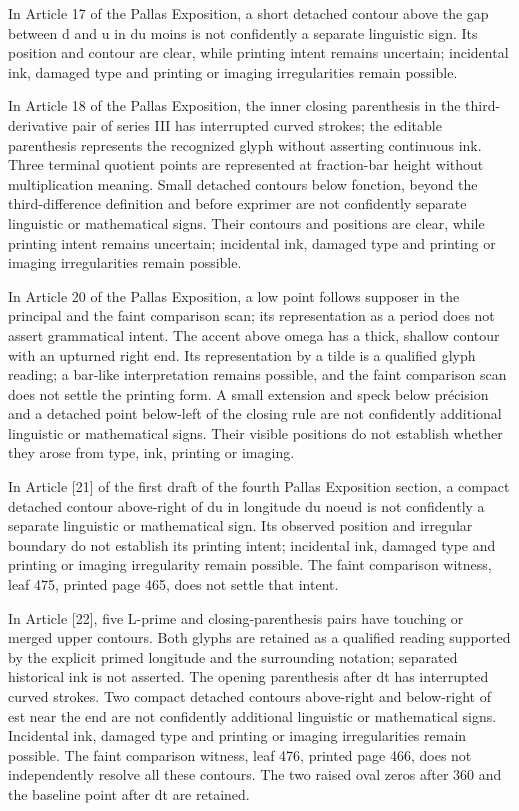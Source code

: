 In Article 17 of the Pallas Exposition, a short detached contour above the gap between d and u in du moins is not confidently a separate linguistic sign. Its position and contour are clear, while printing intent remains uncertain; incidental ink, damaged type and printing or imaging irregularities remain possible.

In Article 18 of the Pallas Exposition, the inner closing parenthesis in the third-derivative pair of series III has interrupted curved strokes; the editable parenthesis represents the recognized glyph without asserting continuous ink. Three terminal quotient points are represented at fraction-bar height without multiplication meaning. Small detached contours below fonction, beyond the third-difference definition and before exprimer are not confidently separate linguistic or mathematical signs. Their contours and positions are clear, while printing intent remains uncertain; incidental ink, damaged type and printing or imaging irregularities remain possible.

In Article 20 of the Pallas Exposition, a low point follows supposer in the principal and the faint comparison scan; its representation as a period does not assert grammatical intent. The accent above omega has a thick, shallow contour with an upturned right end. Its representation by a tilde is a qualified glyph reading; a bar-like interpretation remains possible, and the faint comparison scan does not settle the printing form. A small extension and speck below précision and a detached point below-left of the closing rule are not confidently additional linguistic or mathematical signs. Their visible positions do not establish whether they arose from type, ink, printing or imaging.

In Article [21] of the first draft of the fourth Pallas Exposition section, a compact detached contour above-right of du in longitude du noeud is not confidently a separate linguistic or mathematical sign. Its observed position and irregular boundary do not establish its printing intent; incidental ink, damaged type and printing or imaging irregularity remain possible. The faint comparison witness, leaf 475, printed page 465, does not settle that intent.

In Article [22], five L-prime and closing-parenthesis pairs have touching or merged upper contours. Both glyphs are retained as a qualified reading supported by the explicit primed longitude and the surrounding notation; separated historical ink is not asserted. The opening parenthesis after dt has interrupted curved strokes. Two compact detached contours above-right and below-right of est near the end are not confidently additional linguistic or mathematical signs. Incidental ink, damaged type and printing or imaging irregularities remain possible. The faint comparison witness, leaf 476, printed page 466, does not independently resolve all these contours. The two raised oval zeros after 360 and the baseline point after dt are retained.

